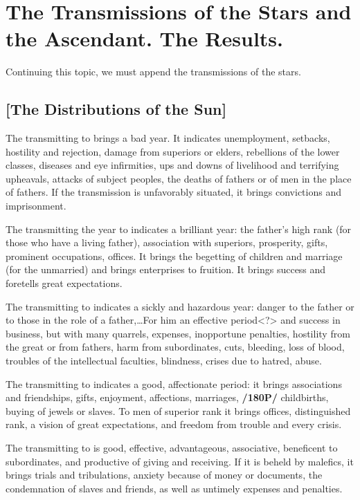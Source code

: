 \section{The Transmissions of the Stars and the Ascendant. The Results.}

Continuing this topic, we must append the transmissions of the stars.

\subsection{[The Distributions of the Sun]}
The \Sun\xspace transmitting to \Saturn\xspace brings a bad year. It indicates unemployment, setbacks, hostility and
rejection, damage from superiors or elders, rebellions of the lower classes, diseases and eye infirmities, ups and downs of livelihood and terrifying upheavals, attacks of subject peoples, the deaths of fathers or of men in the place of fathers. If the transmission is unfavorably situated, it brings convictions and imprisonment.

The \Sun\xspace transmitting the year to \Jupiter\xspace indicates a brilliant year: the father’s high rank (for those who have a living father), association with superiors, prosperity, gifts, prominent occupations, offices. It brings
the begetting of children and marriage (for the unmarried) and brings enterprises to fruition. It brings success and foretells great expectations.

The \Sun\xspace transmitting to \Mars\xspace indicates a sickly and hazardous year: danger to the father or to those in
the role of a father,\ldots For him an effective period<?> and success in business, but with many quarrels, expenses, inopportune penalties, hostility from the great or from fathers, harm from subordinates, cuts, bleeding, loss of blood, troubles of the intellectual faculties, blindness, crises due to hatred, abuse.

The \Sun\xspace transmitting to \Venus\xspace indicates a good, affectionate period: it brings associations and friendships, gifts, enjoyment, affections, marriages, \textbf{/180P/} childbirths, buying of jewels or slaves. To men of superior rank it brings offices, distinguished rank, a vision of great expectations, and freedom from trouble and every crisis.

The \Sun\xspace transmitting to \Mercury\xspace is good, effective, advantageous, associative, beneficent to subordinates, and productive of giving and receiving. If it is beheld by malefics, it brings trials and tribulations, anxiety because of money or documents, the condemnation of slaves and friends, as well as untimely expenses and penalties.

